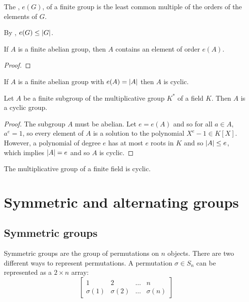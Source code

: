 \begin{definition}
  The , \(e(G)\), of a finite group is the least common multiple of the orders of the elements of \(G\).
\end{definition}

By , \(e(G) \leq \abs{G}\).

\begin{lemma}
  If \(A\) is a finite abelian group, then \(A\) contains an element of order \(e(A)\).
\end{lemma}

\begin{proof}
\end{proof}

\begin{corollary}
  If \(A\) is a finite abelian group with \(e(A) = \abs{A}\) then \(A\) is cyclic.
\end{corollary}

\begin{theorem}
  Let \(A\) be a finite subgroup of the multiplicative group \(K^{*}\) of a field \(K\). Then \(A\) is a cyclic group.
\end{theorem}

\begin{proof}
  The subgroup \(A\) must be abelian. Let \(e = e(A)\) and so for all \(a \in A\), \(a^{e} = 1\), so every element of \(A\) is a solution to the polynomial \(X^{e} - 1 \in K[X]\). However, a polynomial of degree \(e\) has at most \(e\) roots in \(K\) and so \(\abs{A} \leq e\), which implies \(\abs{A} = e\) and so \(A\) is cyclic.
\end{proof}

\begin{corollary}
  The multiplicative group of a finite field is cyclic.
\end{corollary}

\section{Symmetric and alternating groups}

\subsection{Symmetric groups}

Symmetric groups are the group of permutations on \(n\) objects. There are two different ways to represent permutations. A permutation \(\sigma \in S_{n}\) can be represented as a \(2 \times n\) array:
\begin{equation}
  \begin{bmatrix}
    1 & 2 & \ldots & n \\
    \sigma(1) & \sigma(2) & \ldots & \sigma(n)
  \end{bmatrix}
\end{equation}

